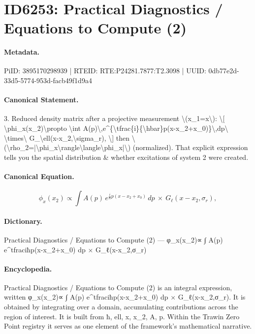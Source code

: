 \section*{ID6253: Practical Diagnostics / Equations to Compute (2)}
\paragraph{Metadata.}
PiID: 3895170298939 | RTEID: RTE:P24281.7877:T2.3098 | UUID: 0db77e2d-33d5-5774-953d-facb49f1d9a4

\paragraph{Canonical Statement.}
3. Reduced density matrix after a projective measurement \textbackslash{}(x\_1=x\textbackslash{}): \textbackslash{}[ \textbackslash{}phi\_x(x\_2)\textbackslash{}propto \textbackslash{}int A(p)\textbackslash{},e\textasciicircum{}\{\textbackslash{}tfrac\{i\}\{\textbackslash{}hbar\}p(x-x\_2+x\_0)\}\textbackslash{},dp\textbackslash{} \textbackslash{}times\textbackslash{} G\_\textbackslash{}ell(x-x\_2,\textbackslash{}sigma\_r), \textbackslash{}] then \textbackslash{}(\textbackslash{}rho\_2=|\textbackslash{}phi\_x\textbackslash{}rangle\textbackslash{}langle\textbackslash{}phi\_x|\textbackslash{}) (normalized). That explicit expression tells you the spatial distribution \& whether excitations of system 2 were created.

\paragraph{Canonical Equation.}
\[
\phi_x(x_2)\propto \int A(p)\,e^{\tfrac{i}{\hbar}p(x-x_2+x_0)}\,dp\ \times\ G_\ell(x-x_2,\sigma_r),
\]

\paragraph{Dictionary.}
Practical Diagnostics / Equations to Compute (2) — φ\_x(x\_2)∝ ∫ A(p) e\textasciicircum{}tfraciħp(x-x\_2+x\_0) dp × G\_ℓ(x-x\_2,σ\_r)

\paragraph{Encyclopedia.}
Practical Diagnostics / Equations to Compute (2) is an integral expression, written φ\_x(x\_2)∝ ∫ A(p) e\textasciicircum{}tfraciħp(x-x\_2+x\_0) dp × G\_ℓ(x-x\_2,σ\_r). It is obtained by integrating over a domain, accumulating contributions across the region of interest. It is built from ħ, ell, x, x\_2, A, p. Within the Trawin Zero Point registry it serves as one element of the framework's mathematical narrative.
